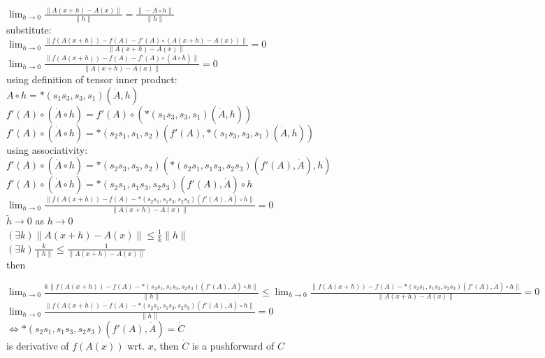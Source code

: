 \documentclass[8pt]{extarticle}
\begin{document}
\begin{multicols*}{2}
  $\lim_{h\rightarrow 0} \frac{\| A(x+h) - A(x)\|}{\| h \|} = \frac{\| - \dot{A} \circ h \|}{\| h \|}$\\

  substitute:\\
  $\lim_{h \rightarrow 0} \frac{\| f(A(x+h)) - f(A) - f'(A) \circ (A(x+h) - A(x)) \|}{\| A(x+h) - A(x) \|} = 0$\\
  $\lim_{h \rightarrow 0} \frac{\| f(A(x+h)) - f(A) - f'(A) \circ (\dot{A} \circ h) \|}{\| A(x+h) - A(x) \|} = 0$\\

  using definition of tensor inner product:\\
  $\dot{A} \circ h = *(s_1 s_3, s_3, s_1)(\dot{A}, h)$\\
  $f'(A) \circ (\dot{A} \circ h) = f'(A) \circ (*(s_1 s_3, s_3, s_1)(\dot{A}, h))$\\
  $f'(A) \circ (\dot{A} \circ h) = *(s_2 s_1, s_1, s_2)(f'(A), *(s_1 s_3, s_3, s_1)(\dot{A}, h))$\\

  using associativity:\\
  $f'(A) \circ (\dot{A} \circ h) = *(s_2 s_3, s_3, s_2)(*(s_2 s_1, s_1 s_3, s_2 s_3)(f'(A), \dot{A}), h)$\\
  $f'(A) \circ (\dot{A} \circ h) = *(s_2 s_1, s_1 s_3, s_2 s_3)(f'(A), \dot{A}) \circ h$\\

  $\lim_{h \rightarrow 0} \frac{\| f(A(x+h)) - f(A) - *(s_2 s_1, s_1 s_3, s_2 s_3)(f'(A), \dot{A}) \circ h \|}{\| A(x+h) - A(x) \|} = 0$\\

  $\tilde{h} \rightarrow 0$ as $h \rightarrow 0$\\
  $(\exists k) \| A(x+h) - A(x) \| \leq \frac{1}{k} \| h \|$\\
  $(\exists k) \frac{k}{\|h\|} \leq \frac{1}{\| A(x+h) - A(x) \|}$\\
  then

  $\lim_{h \rightarrow 0} \frac{ k \| f(A(x+h)) - f(A) - *(s_2 s_1, s_1 s_3, s_2 s_3)(f'(A), \dot{A}) \circ h \|}{\|h\|} \leq \lim_{h\rightarrow 0} \frac{\| f(A(x+h)) - f(A) - *(s_2 s_1, s_1 s_3, s_2 s_3)(f'(A), \dot{A}) \circ h \|}{\|A(x+h) - A(x)\|} = 0$\\

  $\lim_{h \rightarrow 0} \frac{\| f(A(x+h)) - f(A) - *(s_2 s_1, s_1 s_3, s_2 s_3)(f'(A), \dot{A}) \circ h \|}{\|h\|} = 0$ \\
  $\iff *(s_2 s_1, s_1 s_3, s_2 s_3)(f'(A), \dot{A}) = \dot{C}$ \\
  is derivative of $f(A(x))$ wrt. $x$, then $\dot{C}$ is a pushforward of $C$
  

\end{multicols*}
\end{document}
